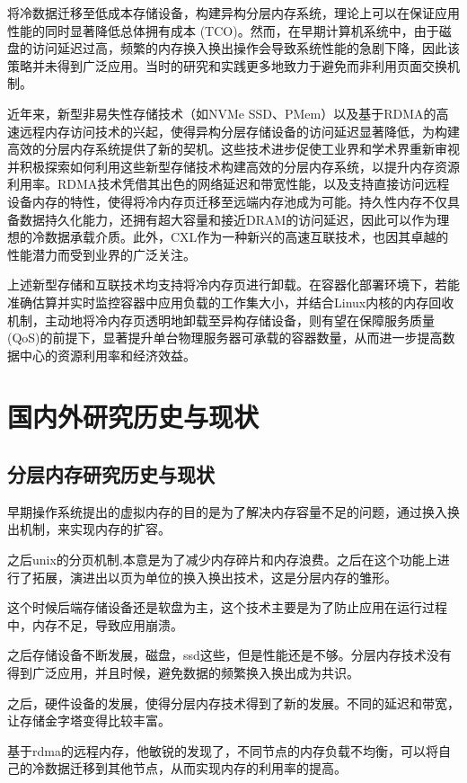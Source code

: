 将冷数据迁移至低成本存储设备，构建异构分层内存系统，理论上可以在保证应用性能的同时显著降低总体拥有成本 (TCO)。然而，在早期计算机系统中，由于磁盘的访问延迟过高，频繁的内存换入换出操作会导致系统性能的急剧下降，因此该策略并未得到广泛应用。当时的研究和实践更多地致力于避免而非利用页面交换机制。

近年来，新型非易失性存储技术（如NVMe SSD、PMem）以及基于RDMA的高速远程内存访问技术的兴起，使得异构分层存储设备的访问延迟显著降低，为构建高效的分层内存系统提供了新的契机。这些技术进步促使工业界和学术界重新审视并积极探索如何利用这些新型存储技术构建高效的分层内存系统，以提升内存资源利用率。RDMA技术凭借其出色的网络延迟和带宽性能，以及支持直接访问远程设备内存的特性，使得将冷内存页迁移至远端内存池成为可能。持久性内存不仅具备数据持久化能力，还拥有超大容量和接近DRAM的访问延迟，因此可以作为理想的冷数据承载介质。此外，CXL作为一种新兴的高速互联技术，也因其卓越的性能潜力而受到业界的广泛关注。

上述新型存储和互联技术均支持将冷内存页进行卸载。在容器化部署环境下，若能准确估算并实时监控容器中应用负载的工作集大小，并结合Linux内核的内存回收机制，主动地将冷内存页透明地卸载至异构存储设备，则有望在保障服务质量(QoS)的前提下，显著提升单台物理服务器可承载的容器数量，从而进一步提高数据中心的资源利用率和经济效益。



\section{国内外研究历史与现状}

\subsection{分层内存研究历史与现状}

早期操作系统提出的虚拟内存的目的是为了解决内存容量不足的问题，通过换入换出机制，来实现内存的扩容。

之后unix的分页机制,本意是为了减少内存碎片和内存浪费。之后在这个功能上进行了拓展，演进出以页为单位的换入换出技术，这是分层内存的雏形。

这个时候后端存储设备还是软盘为主，这个技术主要是为了防止应用在运行过程中，内存不足，导致应用崩溃。

之后存储设备不断发展，磁盘，ssd这些，但是性能还是不够。分层内存技术没有得到广泛应用，并且时候，避免数据的频繁换入换出成为共识。

之后，硬件设备的发展，使得分层内存技术得到了新的发展。不同的延迟和带宽，让存储金字塔变得比较丰富。

基于rdma的远程内存，他敏锐的发现了，不同节点的内存负载不均衡，可以将自己的冷数据迁移到其他节点，从而实现内存的利用率的提高。

